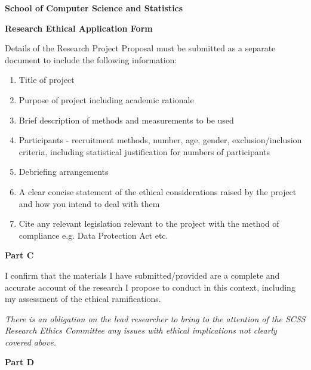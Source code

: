\begin{tcolorbox}
    \begin{center}
        \textbf{\large School of Computer Science and Statistics}

        \textbf{\large Research Ethical Application Form}
    \end{center}
\end{tcolorbox}
\vspace{0.25cm}

Details of the Research Project Proposal must be submitted as a separate document to include the following information:
\begin{enumerate}
    \item Title of project
    \item Purpose of project including academic rationale
    \item Brief description of methods and measurements to be used
    \item Participants - recruitment methods, number, age, gender, exclusion/inclusion criteria, including statistical justification for numbers of participants
    \item Debriefing arrangements
    \item A clear concise statement of the ethical considerations raised by the project and how you intend to deal with them
    \item Cite any relevant legislation relevant to the project with the method of compliance e.g. Data Protection Act etc.
\end{enumerate}

\begin{tcolorbox}
    \centering
    \textbf{Part C}
\end{tcolorbox}

I confirm that the materials I have submitted/provided are a complete and accurate account of the research I propose to conduct in this context, including my assessment of the ethical ramifications.


\vspace{0.5cm}
\textit{There is an obligation on the lead researcher to bring to the attention of the SCSS Research Ethics Committee any issues with ethical implications not clearly covered above.}

\begin{tcolorbox}
    \centering
    \textbf{Part D}
\end{tcolorbox}

